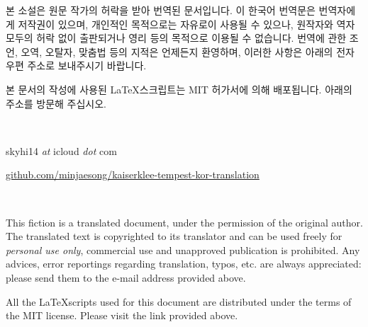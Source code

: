 본 소설은 원문 작가의 허락을 받아 번역된 문서입니다. 이 한국어 번역문은 번역자에게 저작권이 있으며, 개인적인 목적으로는 자유로이 사용될 수 있으나, 원작자와 역자 모두의 허락 없이 출판되거나 영리 등의 목적으로 이용될 수 없습니다. 번역에 관한 조언, 오역, 오탈자, 맞춤법 등의 지적은 언제든지 환영하며, 이러한 사항은 아래의 전자우편 주소로 보내주시기 바랍니다.

본 문서의 작성에 사용된 \LaTeX 스크립트는 MIT 허가서에 의해 배포됩니다. 아래의 주소를 방문해 주십시오.

~

skyhi14 \emph{at} icloud \emph{dot} com

\href{https://github.com/minjaesong/kaiserklee-tempest-kor-translation}{github.com/minjaesong/kaiserklee-tempest-kor-translation}

~

{This fiction is a translated document, under the permission of the original author. The translated text is copyrighted to its translator and can be used freely for \emph{personal use only}, commercial use and unapproved publication is prohibited. Any advices, error reportings regarding translation, typos, etc. are always appreciated: please send them to the e-mail address provided above.

All the \LaTeX scripts used for this document are distributed under the terms of the MIT license. Please visit the link provided above.}
